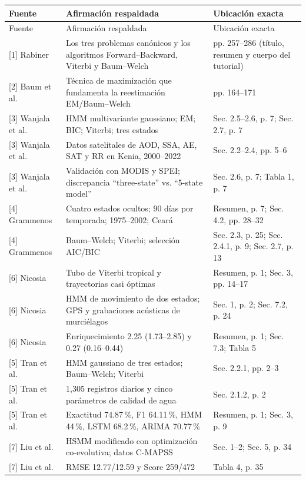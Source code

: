 \documentclass[11pt,a4paper]{article}
\begin{document}
\begin{longtable}{@{}p{1.5cm}p{6.3cm}p{6.4cm}@{}}
\toprule
Fuente & Afirmación respaldada & Ubicación exacta\\
\midrule
\endfirsthead
\toprule
Fuente & Afirmación respaldada & Ubicación exacta\\
\midrule
\endhead
\bottomrule
\endfoot
{[1]} Rabiner & Los tres problemas canónicos y los algoritmos Forward--Backward, Viterbi y Baum--Welch & pp. 257--286 (título, resumen y cuerpo del tutorial)\\
{[2]} Baum et al. & Técnica de maximización que fundamenta la reestimación EM/Baum--Welch & pp. 164--171\\
{[3]} Wanjala et al. & HMM multivariante gaussiano; EM; BIC; Viterbi; tres estados & Sec. 2.5--2.6, p. 7; Sec. 2.7, p. 7\\
{[3]} Wanjala et al. & Datos satelitales de AOD, SSA, AE, SAT y RR en Kenia, 2000--2022 & Sec. 2.2--2.4, pp. 5--6\\
{[3]} Wanjala et al. & Validación con MODIS y SPEI; discrepancia ``three-state'' vs. ``5-state model'' & Sec. 2.6, p. 7; Tabla 1, p. 7\\
{[4]} Grammenos & Cuatro estados ocultos; 90 días por temporada; 1975--2002; Ceará & Resumen, p. 7; Sec. 4.2, pp. 28--32\\
{[4]} Grammenos & Baum--Welch; Viterbi; selección AIC/BIC & Sec. 2.3, p. 25; Sec. 2.4.1, p. 9; Sec. 2.7, p. 13\\
{[6]} Nicosia & Tubo de Viterbi tropical y trayectorias casi óptimas & Resumen, p. 1; Sec. 3, pp. 14--17\\
{[6]} Nicosia & HMM de movimiento de dos estados; GPS y grabaciones acústicas de murciélagos & Sec. 1, p. 2; Sec. 7.2, p. 24\\
{[6]} Nicosia & Enriquecimiento 2.25 (1.73--2.85) y 0.27 (0.16--0.44) & Resumen, p. 1; Sec. 7.3; Tabla 5\\
{[5]} Tran et al. & HMM gaussiano de tres estados; Baum--Welch; Viterbi & Sec. 2.2.1, pp. 2--3\\
{[5]} Tran et al. & 1{,}305 registros diarios y cinco parámetros de calidad de agua & Sec. 2.1.2, p. 2\\
{[5]} Tran et al. & Exactitud 74.87\,\%, F1 64.11\,\%, HMM 44\,\%, LSTM 68.2\,\%, ARIMA 70.77\,\% & Resumen, p. 1; Sec. 3, p. 9\\
{[7]} Liu et al. & HSMM modificado con optimización co-evolutiva; datos C-MAPSS & Sec. 1--2; Sec. 5, p. 34\\
{[7]} Liu et al. & RMSE 12.77/12.59 y Score 259/472 & Tabla 4, p. 35\\

\end{longtable}
\end{document}
